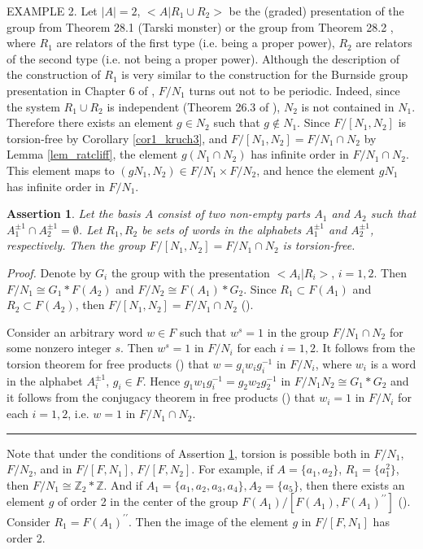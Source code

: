 \documentclass[12pt,reqno]{amsart}
\def\edvo{\rule {6pt}{6pt}}
\newtheorem{cl}{Assertion}
\begin{document}
    EXAMPLE 2. Let $|A|=2$, $<A|R_1\cup R_2>$ be the (graded) presentation of the group from Theorem 28.1 \cite{olsh} (Tarski monster) or the group from Theorem 28.2 \cite{olsh}, where $R_1$ are relators of the first type (i.e. being a proper power), $R_2$ are relators of the second type (i.e. not being a proper power).
    Although the description of the construction of $R_1$ is very similar to the construction for the Burnside group presentation in Chapter 6 of \cite{olsh}, $F/N_1$ turns out not to be periodic.   Indeed, since the system $R_1\cup R_2$ is independent
       (Theorem 26.3 of \cite{olsh}), $N_2$ is not contained in $N_1$. Therefore there exists an element $g\in N_2$ such that $g\notin N_1$. Since $F/[N_1, N_2]$ is torsion-free by Corollary \ref{cor1_kruch3}, and $F/[N_1, N_2] = F/N_1\cap N_2$ by Lemma \ref{lem_ratcliff}, the element $g(N_1\cap N_2)$ has infinite order in $F/N_1\cap N_2$. This element maps to $(gN_1,N_2)\in F/N_1\times F/N_2$, and hence the element $gN_1$ has infinite order in $F/N_1$.


\begin{cl}\label{claim1}
 Let the basis $A$ consist of two non-empty parts $A_1$ and $A_2$ such that $A_1^{\pm 1}\cap A_2^{\pm 1}=\emptyset$. Let $R_1, R_2$ be sets of words in the alphabets $A_1^{\pm 1}$ and $A_2^{\pm 1}$, respectively.
Then the group $F/[N_1,N_2]=F/N_1\cap N_2$ is torsion-free.
 \end{cl}
 {\it Proof.}
Denote by $G_i$ the group with the presentation $<A_i|R_i>$, $i=1,2$.
 Then $F/N_1\cong G_1\ast F(A_2)$ and $F/N_2 \cong F(A_1)\ast G_2$. Since $R_1\subset F(A_1)$ and $R_2\subset F(A_2)$, then $F/[N_1,N_2]=F/N_1\cap N_2$ (\cite{lind=my}).

 Consider an arbitrary word $w\in F$ such that $w^s=1$ in the group $F/N_1\cap N_2$ for some nonzero integer $s$. Then $w^s=1$ in $F/N_i$ for each $i=1,2$. It follows from the torsion theorem for free products (\cite{lind}) that $w=g_iw_ig_i^{-1}$ in $F/N_i$, where $w_i$ is a word in the alphabet $A_i^{\pm 1}$, $g_i\in F$. Hence $g_1w_1g_i^{-1}=g_2w_2g_2^{-1}$ in $F/N_1N_2 \cong G_1\ast G_2$ and it follows from the conjugacy theorem in free products (\cite{lind}) that $w_i=1$ in $F/N_i$ for each $i=1,2$, i.e. $w=1$ in $F/N_1\cap N_2$.
 \edvo

 Note that under the conditions of Assertion \ref{claim1}, torsion is possible both in $F/N_1$, $F/N_2$, and in  $F/[F,N_1]$, $F/[F,N_2]$. For example, if $A=\{a_1,a_2\}$, $R_1=\{a_1^2\}$, then $F/N_1\cong \mathbb{Z}_2*\mathbb{Z}$. And if $A_1=\{a_1,a_2,a_3,a_4\}, A_2=\{a_5\}$, then there exists an element $g$ of order 2 in the center of the group $F(A_1)/[F(A_1), F(A_1)^{\prime\prime}]$ (\cite{ch_gupta}). Consider $R_1=F(A_1)^{\prime\prime}$. Then the image of the element $g$ in $F/[F,N_1]$ has order 2.
\end{document}
